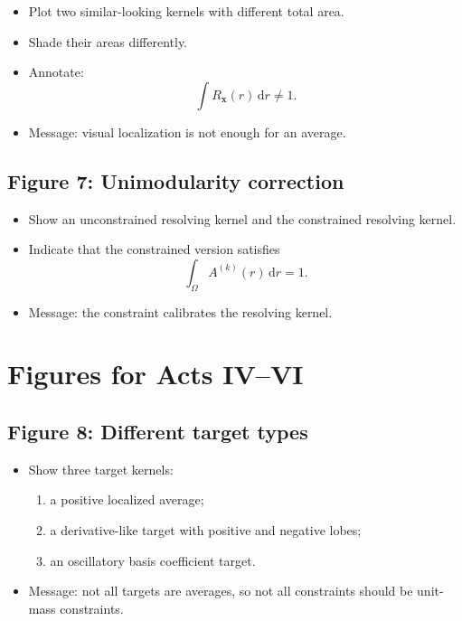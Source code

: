 \documentclass[11pt,openany]{book}
\theoremstyle{definition}
\theoremstyle{remark}
\newcommand{\dd}{\,\mathrm d}
\begin{document}
\begin{itemize}[leftmargin=*]
  \item Plot two similar-looking kernels with different total area.
  \item Shade their areas differently.
  \item Annotate:
  \[
    \int R_{\mathbf x}(r)\dd r\neq 1.
  \]
  \item Message: visual localization is not enough for an average.
\end{itemize}

\subsection*{Figure 7: Unimodularity correction}

\begin{itemize}[leftmargin=*]
  \item Show an unconstrained resolving kernel and the constrained resolving kernel.
  \item Indicate that the constrained version satisfies
  \[
    \int_\Omega A^{(k)}(r)\dd r=1.
  \]
  \item Message: the constraint calibrates the resolving kernel.
\end{itemize}

\section{Figures for Acts IV--VI}

\subsection*{Figure 8: Different target types}

\begin{itemize}[leftmargin=*]
  \item Show three target kernels:
  \begin{enumerate}[label=(\alph*)]
    \item a positive localized average;
    \item a derivative-like target with positive and negative lobes;
    \item an oscillatory basis coefficient target.
  \end{enumerate}
  \item Message: not all targets are averages, so not all constraints should be unit-mass
  constraints.
\end{itemize}
\end{document}
